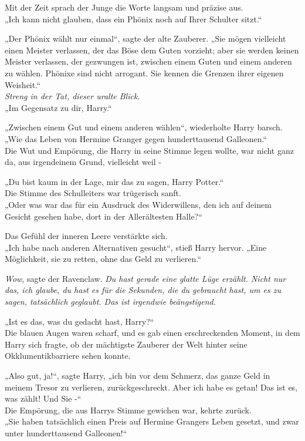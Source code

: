 {Mit der Zeit sprach der Junge die Worte langsam und präzise aus.\\ „Ich kann nicht glauben, dass ein Phönix noch auf Ihrer Schulter sitzt.“

„Der Phönix wählt nur einmal“, sagte der alte Zauberer. „Sie mögen vielleicht einen Meister verlassen, der das Böse dem Guten vorzieht; aber sie werden keinen Meister verlassen, der gezwungen ist, zwischen einem Guten und einem anderen zu wählen. Phönixe sind nicht arrogant. Sie kennen die Grenzen ihrer eigenen Weisheit.“\\ \emph{Streng in der Tat, dieser uralte Blick.}\\ „Im Gegensatz zu dir, Harry.“

„Zwischen einem Gut und einem anderen wählen“, wiederholte Harry barsch. „Wie das Leben von Hermine Granger gegen hunderttausend Galleonen.“\\ Die Wut und Empörung, die Harry in seine Stimme legen wollte, war nicht ganz da, aus irgendeinem Grund, vielleicht weil -

„Du bist kaum in der Lage, mir das zu sagen, Harry Potter.“\\ Die Stimme des Schulleiters war trügerisch sanft.\\ „Oder was war das für ein Ausdruck des Widerwillens, den ich auf deinem Gesicht gesehen habe, dort in der Allerältesten Halle?“

Das Gefühl der inneren Leere verstärkte sich.\\ „Ich habe nach anderen Alternativen gesucht“, stieß Harry hervor. „Eine Möglichkeit, sie zu retten, ohne das Geld zu verlieren.“

\emph{Wow}, sagte der Ravenclaw. \emph{Du hast gerade eine glatte Lüge erzählt. Nicht nur das, ich glaube, du hast es für die Sekunden, die du gebraucht hast, um es zu sagen, tatsächlich geglaubt. Das ist irgendwie beängstigend.}

„Ist es das, was du gedacht hast, Harry?“\\ Die blauen Augen waren scharf, und es gab einen erschreckenden Moment, in dem Harry sich fragte, ob der mächtigste Zauberer der Welt hinter seine Okklumentikbarriere sehen konnte.

„Also gut, ja!“, sagte Harry, „ich bin vor dem Schmerz, das ganze Geld in meinem Tresor zu verlieren, zurückgeschreckt. Aber ich habe es getan! Das ist es, was zählt! Und Sie -“\\ Die Empörung, die aus Harrys Stimme gewichen war, kehrte zurück.\\ „Sie haben tatsächlich einen Preis auf Hermine Grangers Leben gesetzt, und zwar unter hunderttausend Galleonen!“

}
